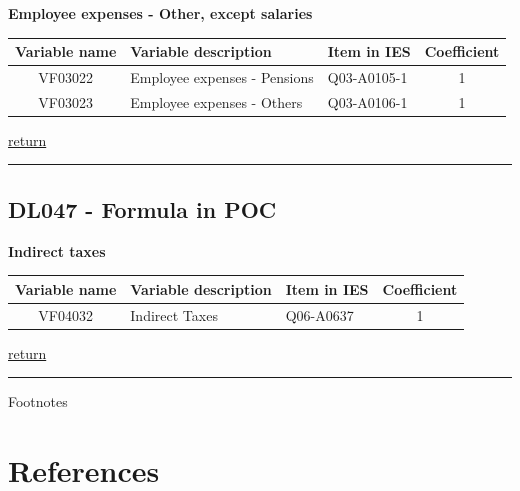\documentclass[]{book}
\begin{document}
\textbf{Employee expenses - Other, except salaries}

\begin{longtable}[]{@{}cllc@{}}
\toprule
Variable name & Variable description & Item in IES & Coefficient\tabularnewline
\midrule
\endhead
VF03022 & Employee expenses - Pensions & Q03-A0105-1 & 1\tabularnewline
VF03023 & Employee expenses - Others & Q03-A0106-1 & 1\tabularnewline
\bottomrule
\end{longtable}

\protect\hyperlink{b3.-profit-and-loss-statement-variables}{return}

\begin{center}\rule{0.5\linewidth}{\linethickness}\end{center}

\hypertarget{dl047---formula-in-poc}{%
\section{DL047 - Formula in POC}\label{dl047---formula-in-poc}}

\textbf{Indirect taxes}

\begin{longtable}[]{@{}cllc@{}}
\toprule
Variable name & Variable description & Item in IES & Coefficient\tabularnewline
\midrule
\endhead
VF04032 & Indirect Taxes & Q06-A0637 & 1\tabularnewline
\bottomrule
\end{longtable}

\protect\hyperlink{b3.-profit-and-loss-statement-variables}{return}

\begin{center}\rule{0.5\linewidth}{\linethickness}\end{center}

Footnotes

\hypertarget{references-1}{%
\chapter{References}\label{references-1}}


\end{document}
